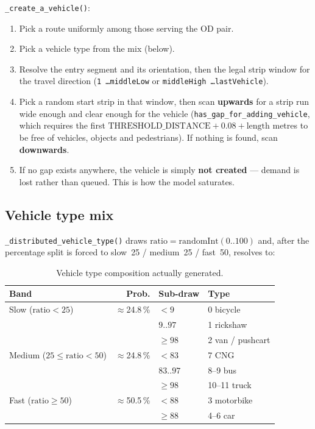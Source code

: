 \documentclass[11pt, a4paper]{article}
\newcommand{\code}[1]{\texttt{#1}}
\begin{document}
\code{\_create\_a\_vehicle()}:
\begin{enumerate}
    \item Pick a route uniformly among those serving the OD pair.
    \item Pick a vehicle type from the mix (below).
    \item Resolve the entry segment and its orientation, then the legal strip
          window for the travel direction (\code{1 \dots middleLow} or
          \code{middleHigh \dots lastVehicle}).
    \item Pick a random start strip in that window, then scan \textbf{upwards}
          for a strip run wide enough and clear enough for the vehicle
          (\code{has\_gap\_for\_adding\_vehicle}, which requires the first
          $\text{THRESHOLD\_DISTANCE} + 0.08 + \text{length}$ metres to be free
          of vehicles, objects and pedestrians). If nothing is found, scan
          \textbf{downwards}.
    \item If no gap exists anywhere, the vehicle is simply \textbf{not created}
          --- demand is lost rather than queued. This is how the model saturates.
\end{enumerate}

\subsection{Vehicle type mix}
\label{sec:mix}

\code{\_distributed\_vehicle\_type()} draws
$\text{ratio} = \text{randomInt}(0..100)$ and, after the percentage split is
forced to slow~25 / medium~25 / fast~50, resolves to:

\begin{table}[h!]
\centering
\begin{tabular}{l r l l}
\toprule
\textbf{Band} & \textbf{Prob.} & \textbf{Sub-draw} & \textbf{Type} \\
\midrule
Slow ($\text{ratio} < 25$)   & $\approx$24.8\,\% & $<9$      & 0 bicycle \\
                             &                   & $9..97$   & 1 rickshaw \\
                             &                   & $\geq 98$ & 2 van / pushcart \\
\midrule
Medium ($25 \leq \text{ratio} < 50$) & $\approx$24.8\,\% & $<83$     & 7 CNG \\
                             &                   & $83..97$  & 8--9 bus \\
                             &                   & $\geq 98$ & 10--11 truck \\
\midrule
Fast ($\text{ratio} \geq 50$)& $\approx$50.5\,\% & $<88$     & 3 motorbike \\
                             &                   & $\geq 88$ & 4--6 car \\
\bottomrule
\end{tabular}
\caption{Vehicle type composition actually generated.}
\end{table}
\end{document}
